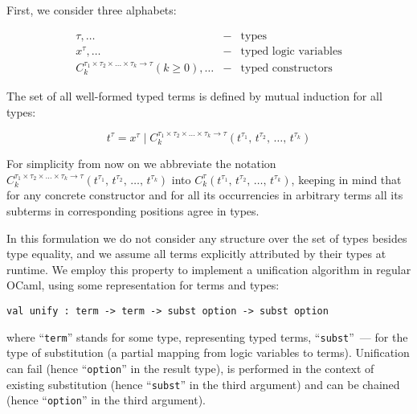 First, we consider three alphabets:

$$
\begin{array}{rcl}
  \tau,\dots&-&\mbox{types}\\
  x^\tau,\dots&-&\mbox{typed logic variables}\\
  C_k^{\tau_1\times\tau_2\times\dots\times\tau_k\to\tau} (k\ge 0),\dots&-&\mbox{typed constructors}
\end{array}
$$

The set of all well-formed typed terms is defined by mutual induction for all types:

$$
t^\tau=x^\tau\mid C_k^{\tau_1\times\tau_2\times\dots\times\tau_k\to\tau}(t^{\tau_1},\,t^{\tau_2},\,\dots,\,t^{\tau_k})
$$

For simplicity from now on we abbreviate the notation $C_k^{\tau_1\times\tau_2\times\dots\times\tau_k\to\tau}(t^{\tau_1},\,t^{\tau_2},\,\dots,\,t^{\tau_k})$ into 
$C_k^\tau(t^{\tau_1},\,t^{\tau_2},\,\dots,\,t^{\tau_k})$, keeping in mind that for any concrete constructor and for all its occurrencies 
in arbitrary terms all its subterms in corresponding positions agree in types. 

\begin{comment}
We need also to define the notion of a subterm  $t^\tau[p]$ of a term $t^\tau$ at given position $p$:

$$
\begin{array}{rcl}
 p=\epsilon\mid\{1, 2, 3,\dots\}\bullet p&-&\mbox{the set of positions}\\
 t^\tau[\epsilon]=t^\tau&-&\mbox{base case}\\
 C_k^\tau(t_1^{\tau_1},\,t_2^{\tau_2},\dots,\,t_k^{\tau_k})[i\bullet p]=t_i^{\tau_i}[p], 1\le i \le k&-&\mbox{inductive case}
\end{array}
$$
\end{comment}

In this formulation we do not consider any structure over the set of types besides type equality, and we assume all terms explicitly 
attributed by their types at runtime. We employ this property to implement a unification algorithm in regular OCaml, using some
representation for terms and types:

\begin{lstlisting}[mathescape=true]
    val unify : term -> term -> subst option -> subst option
\end{lstlisting}

\noindent where ``\lstinline{term}'' stands for some type, representing typed terms, ``\lstinline{subst}''~--- for the type of 
substitution (a partial mapping from logic variables to terms). Unification can fail (hence ``\lstinline{option}'' in the result type), 
is performed in the context of existing substitution (hence ``\lstinline{subst}'' in the third argument) and can be 
chained (hence ``\lstinline{option}'' in the third argument). 

